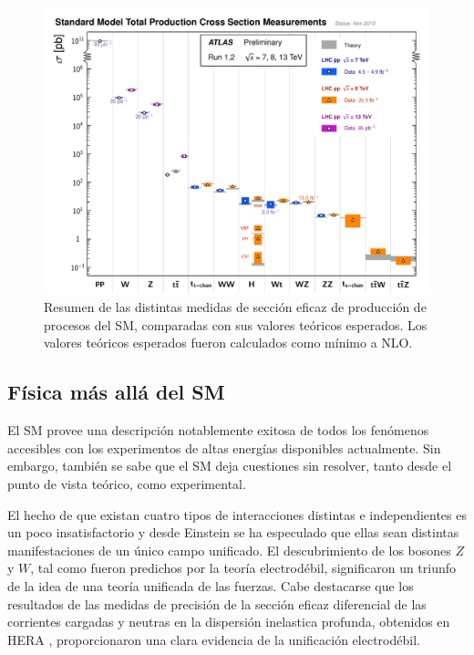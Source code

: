 \begin{figure}[!htb]
  \centering
  \includegraphics[width=1\textwidth]{figures/ATLAS_a_SMSummary_TotalXsect_new.pdf}
  \caption{Resumen de las distintas medidas de sección eficaz de producción de
    procesos del SM, comparadas con sus valores teóricos esperados.
    Los valores teóricos esperados fueron calculados como mínimo a NLO\cite{ATLASSM}.}
  \label{fig:sm_atlas_xs}
\end{figure}




\subsection{Física más allá del SM}

El SM provee una descripción notablemente exitosa de todos los fenómenos
accesibles con los experimentos de altas energías disponibles actualmente. Sin
embargo, también se sabe que el SM deja cuestiones sin resolver, tanto desde el
punto de vista teórico, como experimental.

El hecho de que existan cuatro tipos de interacciones distintas e independientes
es un poco insatisfactorio y desde Einstein se ha especulado que ellas sean
distintas manifestaciones de un único campo unificado. El descubrimiento de los
bosones $Z$ y $W$, tal como fueron predichos por la teoría electrodébil,
significaron un triunfo de la idea de una teoría unificada de las fuerzas. Cabe
destacarse que los resultados de las medidas de precisión de la sección eficaz
diferencial de las corrientes cargadas y neutras en la dispersión inelastica
profunda, obtenidos en HERA \cite{Hera}, proporcionaron una clara evidencia de
la unificación electrodébil.

